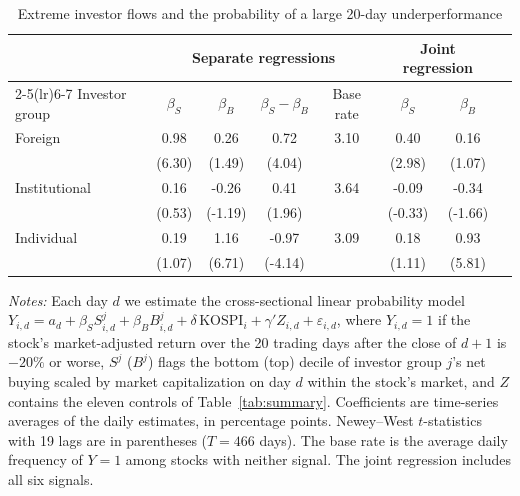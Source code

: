 \begin{table}[htbp]\centering
\caption{Extreme investor flows and the probability of a large 20-day underperformance}\label{tab:tail}
\small
\begin{tabular}{lccccccc}\toprule
 & \multicolumn{4}{c}{Separate regressions} & \multicolumn{2}{c}{Joint regression} \\
\cmidrule(lr){2-5}\cmidrule(lr){6-7}
Investor group & $\beta_S$ & $\beta_B$ & $\beta_S-\beta_B$ & Base rate & $\beta_S$ & $\beta_B$ \\\midrule
Foreign & 0.98 & 0.26 & 0.72 & 3.10 & 0.40 & 0.16 \\
 & (6.30) & (1.49) & (4.04) & & (2.98) & (1.07) \\[2pt]
Institutional & 0.16 & -0.26 & 0.41 & 3.64 & -0.09 & -0.34 \\
 & (0.53) & (-1.19) & (1.96) & & (-0.33) & (-1.66) \\[2pt]
Individual & 0.19 & 1.16 & -0.97 & 3.09 & 0.18 & 0.93 \\
 & (1.07) & (6.71) & (-4.14) & & (1.11) & (5.81) \\[2pt]
\bottomrule\end{tabular}
\begin{minipage}{0.95\textwidth}\vspace{0.5em}\scriptsize
\textit{Notes:} Each day $d$ we estimate the cross-sectional linear probability model $Y_{i,d}=a_d+\beta_S S^j_{i,d}+\beta_B B^j_{i,d}+\delta\,\mathrm{KOSPI}_i+\gamma'Z_{i,d}+\varepsilon_{i,d}$, where $Y_{i,d}=1$ if the stock's market-adjusted return over the 20 trading days after the close of $d+1$ is $-20\%$ or worse, $S^j$ ($B^j$) flags the bottom (top) decile of investor group $j$'s net buying scaled by market capitalization on day $d$ within the stock's market, and $Z$ contains the eleven controls of Table~\ref{tab:summary}. Coefficients are time-series averages of the daily estimates, in percentage points. Newey--West $t$-statistics with 19 lags are in parentheses ($T=466$ days). The base rate is the average daily frequency of $Y=1$ among stocks with neither signal. The joint regression includes all six signals.
\end{minipage}\end{table}